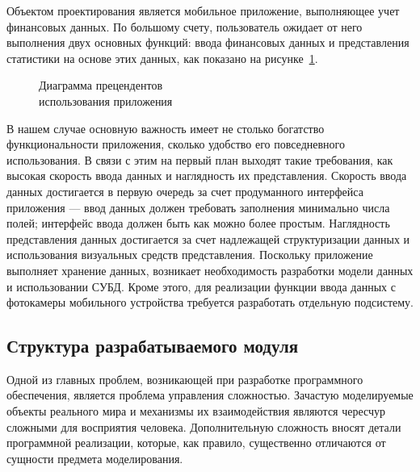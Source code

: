 Объектом проектирования является мобильное приложение,
выполняющее учет финансовых данных. По большому счету, пользователь
ожидает от него выполнения двух основных функций:
ввода финансовых данных и представления статистики на основе этих данных,
как показано на рисунке~\ref{fig:design_use_cases}.

\begin{figure}[h!]
  \centering
  \caption{Диаграмма прецендентов \\ использования приложения}
  \label{fig:design_use_cases}
\end{figure}

В нашем случае основную важность имеет не столько богатство
функциональности приложения, сколько удобство его повседневного использования.
В связи с этим на первый план выходят такие требования, как
высокая скорость ввода данных и наглядность их представления.
Скорость ввода данных достигается в первую очередь за счет
продуманного интерфейса приложения ---
ввод данных должен требовать заполнения минимально числа полей;
интерфейс ввода должен быть как можно более простым.
Наглядность представления данных достигается за счет надлежащей
структуризации данных и использования визуальных средств представления.
Поскольку приложение выполняет хранение данных, возникает необходимость
разработки модели данных и использовании СУБД.
Кроме этого, для реализации функции ввода данных с
фотокамеры мобильного устройства
требуется разработать отдельную подсистему.

\subsection{Структура разрабатываемого модуля}
\label{subsec:design_structure}

Одной из главных проблем, возникающей при разработке программного обеспечения,
является проблема управления сложностью. Зачастую моделируемые объекты реального
мира и механизмы их взаимодействия являются чересчур сложными для восприятия человека.
Дополнительную сложность вносят детали программной
реализации, которые, как правило, существенно отличаются
от сущности предмета моделирования.

